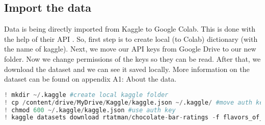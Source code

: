 \subsection{Import the data}
Data is being directly imported from Kaggle to Google Colab. This is done with the help of their API \parencite{web:KaggleAPI}. So, first step is to create local (to Colab) dictionary (with the name of kaggle). Next, we move our API keys from Google Drive to our new folder. Now we change permissions of the keys so they can be read. After that, we download the dataset and we can see it saved locally. More information on the dataset can be found on appendix A1: About the data.
\begin{lstlisting}[language=Python, caption=Import the data]
! mkdir ~/.kaggle #create local kaggle folder
! cp /content/drive/MyDrive/Kaggle/kaggle.json ~/.kaggle/ #move auth key from one drive to temp folder
! chmod 600 ~/.kaggle/kaggle.json #use auth key
! kaggle datasets download rtatman/chocolate-bar-ratings -f flavors_of_cacao.csv #download the file from kaggle and unzip it while it is downloading
\end{lstlisting}